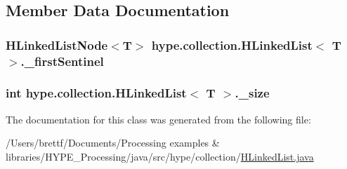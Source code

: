 \subsection{Member Data Documentation}
\hypertarget{classhype_1_1collection_1_1_h_linked_list_3_01_t_01_4_adb6814ff86b4735d216f177b2a254614}{
\subsubsection[{\-\_\-first\-Sentinel}]{\setlength{\rightskip}{0pt plus 5cm}H\-Linked\-List\-Node$<$T$>$ hype.\-collection.\-H\-Linked\-List$<$ T $>$.\-\_\-first\-Sentinel\hspace{0.3cm}{\ttfamily [protected]}}}\label{classhype_1_1collection_1_1_h_linked_list_3_01_t_01_4_adb6814ff86b4735d216f177b2a254614}
\hypertarget{classhype_1_1collection_1_1_h_linked_list_3_01_t_01_4_aeaf64c6da6823f7b2d1c868b77f4e19a}{
\subsubsection[{\-\_\-size}]{\setlength{\rightskip}{0pt plus 5cm}int hype.\-collection.\-H\-Linked\-List$<$ T $>$.\-\_\-size\hspace{0.3cm}{\ttfamily [protected]}}}\label{classhype_1_1collection_1_1_h_linked_list_3_01_t_01_4_aeaf64c6da6823f7b2d1c868b77f4e19a}


The documentation for this class was generated from the following file\-:\begin{DoxyCompactItemize}
\item 
/\-Users/brettf/\-Documents/\-Processing examples \& libraries/\-H\-Y\-P\-E\-\_\-\-Processing/java/src/hype/collection/\hyperlink{_h_linked_list_8java}{H\-Linked\-List.\-java}\end{DoxyCompactItemize}
